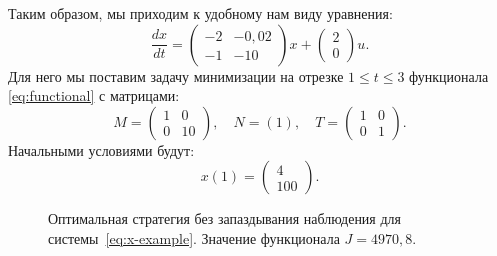 Таким образом, мы приходим к удобному нам виду уравнения:
\begin{equation}\label{eq:x-example}
        \frac{dx}{dt}
        =
        \begin{pmatrix}
-2 & -0,\!02 \\
-1 & -10
        \end{pmatrix}
        x
        +
        \begin{pmatrix}
2 \\
0
        \end{pmatrix}
        u.
\end{equation}
Для него мы поставим задачу минимизации на отрезке $1 \leqslant t \leqslant 3$ функционала \eqref{eq:functional} с матрицами:
$$
        M = \begin{pmatrix}
1 & 0 \\
0 & 10
        \end{pmatrix},
        \quad
        N = (1),
        \quad
        T = \begin{pmatrix}
1 & 0 \\
0 & 1
        \end{pmatrix}.
$$
Начальными условиями будут:
$$
        x(1) = \begin{pmatrix}
4 \\
100
        \end{pmatrix}.
$$
\begin{figure}[bh]
        \noindent{}
        \caption{Оптимальная стратегия без запаздывания наблюдения для системы~\eqref{eq:x-example}. Значение функционала $J = 4970,\!8$.}
        \label{img:simple-control}
\end{figure}
